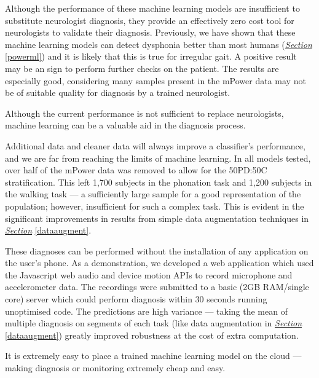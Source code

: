 \documentclass[12pt, twoside]{book}
\begin{document}
Although the performance of these machine learning models are insufficient to substitute neurologist diagnosis, they provide an effectively zero cost tool for neurologists to validate their diagnosis. Previously, we have shown that these machine learning models can detect dysphonia better than most humans (\textit{\hyperref[powerml]{Section}} \ref{powerml}) and it is likely that this is true for irregular gait. A positive result may be an sign to perform further checks on the patient. The results are especially good, considering many samples present in the mPower data may not be of suitable quality for diagnosis by a trained neurologist.

\begin{highlight}
	Although the current performance is not sufficient to replace neurologists, machine learning can be a valuable aid in the diagnosis process.
\end{highlight}

Additional data and cleaner data will always improve a classifier's performance, and we are far from reaching the limits of machine learning. In all models tested, over half of the mPower data was removed to allow for the 50PD:50C stratification. This left 1,700 subjects in the phonation task and 1,200 subjects in the walking task --- a sufficiently large sample for a good representation of the population; however, insufficient for such a complex task. This is evident in the significant improvements in results from simple data augmentation techniques in \textit{\hyperref[dataaugment]{Section}} \ref{dataaugment}. 


These diagnoses can be performed without the installation of any application on the user's phone. As a demonstration, we developed a web application which used the Javascript web audio and device motion APIs to record microphone and accelerometer data. The recordings were submitted to a basic (2GB RAM/single core) server which could perform diagnosis within 30 seconds running unoptimised code. The predictions are high variance --- taking the mean of multiple diagnosis on segments of each task (like data augmentation in \textit{\hyperref[dataaugment]{Section}} \ref{dataaugment}) greatly improved robustness at the cost of extra computation.

\begin{highlight}
It is extremely easy to place a trained machine learning model on the cloud --- making diagnosis or monitoring extremely cheap and easy.
\end{highlight}
\end{document}
